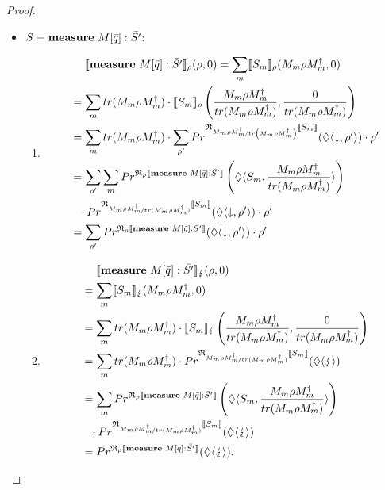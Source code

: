 \documentclass[a4paper,UKenglish,cleveref, autoref, thm-restate]{lipics-v2021}
\begin{document}
\begin{proof}
\begin{enumerate}
\begin{itemize}
        \item $S \equiv \mathbf{measure } \text{ }M[\Bar{q}]:\Bar{S'}$:
        \begin{enumerate}
            \item \begin{align*}
                &\phantom{=.}\llbracket \mathbf{measure } \text{ }M[\Bar{q}]:\Bar{S'} \rrbracket_{\rho}(\rho,0) = \sum_m \llbracket S_m  \rrbracket_{\rho} (M_m \rho M_m ^\dagger ,0)\\
            &= \sum_m tr(M_m \rho M_m ^\dagger) \cdot \llbracket S_m  \rrbracket_{\rho} \left(\frac{M_m \rho M_m ^\dagger}{tr(M_m \rho M_m ^\dagger)} ,\frac{0}{tr(M_m \rho M_m ^\dagger)}\right)\\
            &= \sum_m tr(M_m \rho M_m ^\dagger) \cdot \sum_{\rho'} Pr^{\mathfrak{R}_{\nicefrac{M_m \rho M_m ^\dagger}{tr\left(M_m \rho M_m ^\dagger\right)}}\llbracket S_m \rrbracket}(\lozenge \langle \downarrow , \rho' \rangle) \cdot \rho'\\
            &= \sum_{\rho'} \sum_m Pr^{\mathfrak{R}_{\rho}\llbracket \mathbf{measure } \text{ }M[\Bar{q}]:\Bar{S'} \rrbracket}\left({\lozenge \langle S_m , \frac{M_m \rho M_m ^\dagger}{tr(M_m \rho M_m ^\dagger)} \rangle}\right) \\
            &\phantom{=} \cdot  Pr^{\mathfrak{R}_{\nicefrac{M_m \rho M_m ^\dagger}{tr(M_m \rho M_m ^\dagger)}}\llbracket S_m \rrbracket}(\lozenge \langle \downarrow , \rho' \rangle) \cdot \rho'\\
            &= \sum_{\rho'} Pr^{\mathfrak{R}_{\rho}\llbracket \mathbf{measure } \text{ }M[\Bar{q}]:\Bar{S'} \rrbracket}(\lozenge \langle \downarrow , \rho' \rangle) \cdot \rho'
        \end{align*}
        \item  \begin{align*}
            &\phantom{=.}\llbracket \mathbf{measure } \text{ }M[\Bar{q}]:\Bar{S'} \rrbracket_{\lightning}(\rho,0) \\
            &= \sum_m \llbracket S_m \rrbracket_{\lightning}(M_m \rho M_m^\dagger,0)\\
            &= \sum_m tr(M_m \rho M_m^\dagger) \cdot \llbracket S_m \rrbracket_{\lightning}\left(\frac{M_m \rho M_m^\dagger}{tr(M_m \rho M_m^\dagger)},\frac{0}{tr(M_m \rho M_m^\dagger)}\right)\\
            &= \sum_m tr(M_m \rho M_m^\dagger) \cdot Pr^{\mathfrak{R}_{\nicefrac{M_m \rho M_m^\dagger}{tr(M_m \rho M_m^\dagger)}}\llbracket S_m \rrbracket}(\lozenge \langle \lightning \rangle)  \\
            &= \sum_m Pr^{\mathfrak{R}_{\rho}\llbracket \mathbf{measure } \text{ }M[\Bar{q}]:\Bar{S'} \rrbracket}\left({\lozenge \langle S_m , \frac{M_m \rho M_m ^\dagger}{tr(M_m \rho M_m ^\dagger)} \rangle}\right) \\
            &\phantom{=}\cdot Pr^{\mathfrak{R}_{\nicefrac{M_m \rho M_m^\dagger}{tr(M_m \rho M_m^\dagger)}}\llbracket S_m \rrbracket}(\lozenge \langle \lightning \rangle)  \\
            &=Pr^{\mathfrak{R}_{\rho}\llbracket \mathbf{measure } \text{ }M[\Bar{q}]:\Bar{S'} \rrbracket}(\lozenge \langle \lightning \rangle).
        \end{align*}
        \end{enumerate}



\end{itemize}
\end{enumerate}
\end{proof}
\end{document}
